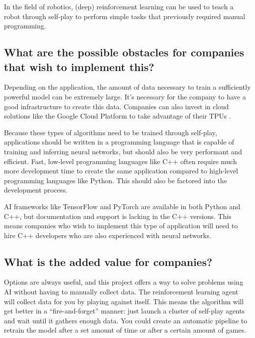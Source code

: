 \documentclass{article}
\begin{document}


In the field of robotics, (deep) reinforcement learning can be used to teach a robot
through self-play to perform simple tasks that previously required manual programming.

\subsection{What are the possible obstacles for companies that wish to implement this?}

Depending on the application, the amount of data necessary to train a sufficiently powerful model
can be extremely large. It's necessary for the company to have a good infrastructure to 
create this data. Companies can also invest in cloud solutions like the Google Cloud Platform
to take advantage of their TPUs \cite{CloudComputingServices}.

Because these types of algorithms need to be trained through self-play, applications should be written
in a programming language that is capable of training and inferring neural networks, 
but should also be very performant and efficient. 
Fast, low-level programming languages like C++ often require much more development time
to create the same application compared to high-level programming languages like Python. 
This should also be factored into the development process.

AI frameworks like TensorFlow and PyTorch are available in both Python and C++, 
but documentation and support is lacking in the C++ versions. This means companies 
who wish to implement this type of application will need to hire C++ developers who
are also experienced with neural networks.

\subsection{What is the added value for companies?}

Options are always useful, and this project offers a way to solve problems 
using AI without having to manually collect data. The reinforcement learning agent 
will collect data for you by playing against itself. This means the algorithm will
get better in a ``fire-and-forget'' manner: just launch a cluster of self-play agents
and wait until it gathers enough data. You could create an automatic pipeline to
retrain the model after a set amount of time or after a certain amount of games.
\end{document}
